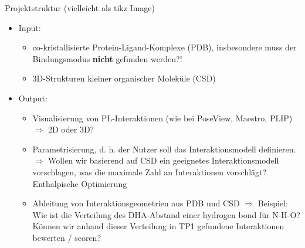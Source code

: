 \begin{frame}{Projektstruktur}
(vielleicht als tikz Image)
\begin{itemize}
    \item Input: 
    \begin{itemize}
        \item co-kristallisierte Protein-Ligand-Komplexe (PDB), insbesondere muss der Bindungsmodus \textbf{nicht} gefunden werden?!
        \item 3D-Strukturen kleiner organischer Moleküle (CSD)
    \end{itemize}
    \item Output: 
    \begin{itemize}
        \item Visualisierung von PL-Interaktionen (wie bei PoseView, Maestro, PLIP) \\
        $\Rightarrow$ 2D oder 3D?
        \item Parametrisierung, d. h. der Nutzer soll das Interaktionsmodell definieren.\\
        $\Rightarrow$ Wollen wir basierend auf CSD ein geeignetes Interaktionsmodell vorschlagen, was die maximale Zahl an Interaktionen vorschlägt? Enthalpische Optimierung
        \item Ableitung von Interaktionsgeometrien aus PDB und CSD
        $\Rightarrow$ Beispiel: Wie ist die Verteilung des DHA-Abstand einer hydrogen bond für N-H-O? Können wir anhand dieser Verteilung in TP1 gefundene Interaktionen bewerten / scoren?
    \end{itemize}
\end{itemize}

\end{frame}